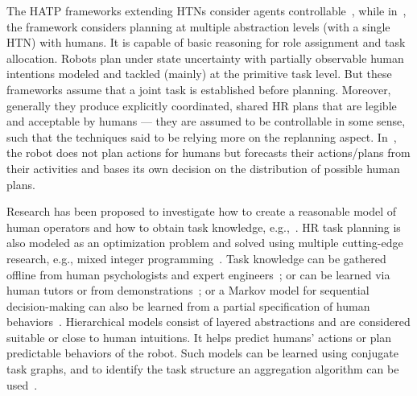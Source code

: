 \documentclass[letterpaper]{article} %
\begin{document}
The HATP frameworks extending HTNs consider agents controllable~\cite{alami2006toward,lallement2018hatp}, while in~\cite{roncone2017transparent}, the framework considers planning at multiple abstraction levels (with a single HTN) with humans. 
It is capable of basic reasoning for role assignment and task allocation. Robots plan under state uncertainty with partially observable human intentions modeled and tackled (mainly) at the primitive task level. 
But these frameworks assume that a joint task is established before planning. Moreover, generally they produce explicitly coordinated, shared HR plans that are legible and acceptable by humans --- they are assumed to be controllable in some sense, such that the techniques said to be relying more on the replanning aspect.
In~\cite{CirilloKS09}, the robot does not plan actions for humans but forecasts their actions/plans from their activities and bases its own decision on the distribution of possible human plans.

Research has been proposed to investigate how to create a reasonable model of human operators and how to obtain task knowledge, e.g.,~\cite{unhelkar2019learning}. 
HR task planning is also modeled as an optimization problem and solved using multiple cutting-edge research, e.g., mixed integer programming~\cite{VatsKL22}. 
Task knowledge can be gathered offline from human psychologists and expert engineers~\cite{levine2014concurrent,wang2018robot,CirilloKS09}; or can be learned via human tutors or from demonstrations~\cite{koppula2016anticipatory}; or a Markov model for sequential decision-making can also be learned from a partial specification of human behaviors~\cite{unhelkar2019learning}. 
% 
Hierarchical models consist of layered abstractions and are considered suitable or close to human intuitions. It helps predict humans' actions or plan predictable behaviors of the robot. 
Such models can be learned using conjugate task graphs, and to identify the task structure an aggregation algorithm can be used~\cite{HayesS16}. 

\end{document}
